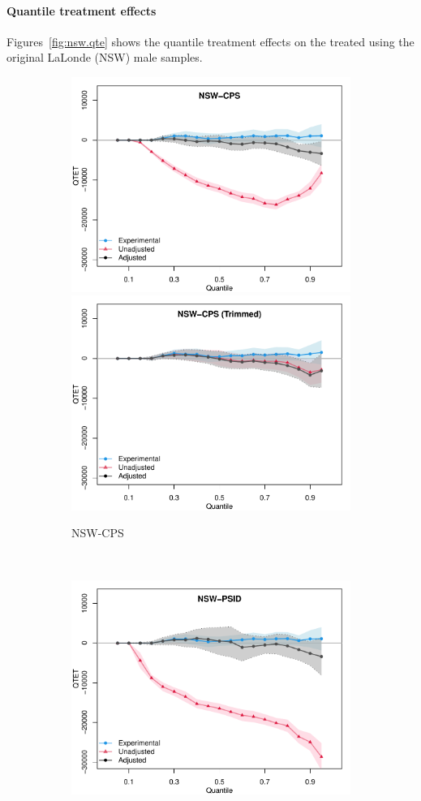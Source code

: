 \documentclass[letterpaper,12pt,leqno]{article}
\begin{document}
\paragraph{Quantile treatment effects} Figures~\ref{fig:nsw.qte} shows the quantile treatment effects on the treated using the original LaLonde (NSW) male samples. 

\begin{figure}[!ht]
    \caption{Quantile Treatment Effects: Experimental vs. Nonexperimental}\label{fig:nsw.qte}
    \begin{minipage}[c]{1\textwidth}
        \centering\vspace{-1em}
        \begin{subfigure}{1\linewidth}\hspace{1em}\centering
            \includegraphics[width=0.45\linewidth]{qte_nsw_cps.pdf}\hspace{2em}
            \includegraphics[width=0.45\linewidth]{qte_nsw_cps_trim.pdf}
            \caption{NSW-CPS}
        \end{subfigure}\\
        \begin{subfigure}{1\linewidth}\hspace{1em}\centering
            \includegraphics[width=0.45\linewidth]{qte_nsw_psid.pdf}\hspace{2em}

\end{subfigure}
\end{minipage}
\end{figure}
\end{document}
